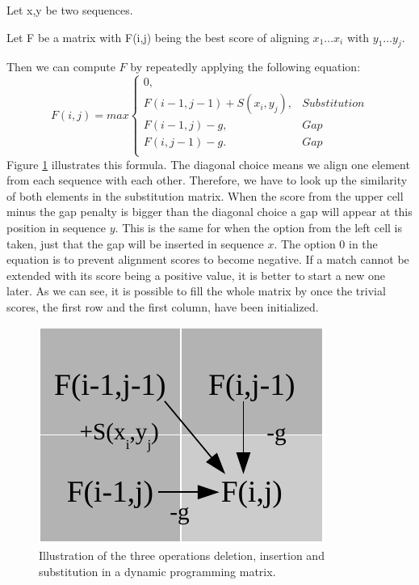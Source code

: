 \begin{definition}
	\item Let x,y be two sequences.
	\item Let F be a matrix with F(i,j) being the best score of aligning $x_1\dots x_i$ with $y_1\dots y_j$.
\end{definition}
Then we can compute $F$ by repeatedly applying the following equation:
\begin{equation}
F(i,j) = max \left\{ \begin{array}{lr}0,&\\F(i-1,j-1)+S(x_i,y_j),&Substitution\\F(i-1,j)-g,&Gap\\F(i,j-1)-g.&Gap\\\end{array} \right.
\end{equation}
Figure \ref{fig:basicalignmentoperations} illustrates this formula.
The diagonal choice means we align one element from each sequence with each other.
Therefore, we have to look up the similarity of both elements in the substitution matrix.
When the score from the upper cell minus the gap penalty is bigger than the diagonal choice a gap will appear at this position in sequence $y$.
This is the same for when the option from the left cell is taken, just that the gap will be inserted in sequence $x$.
The option 0 in the equation is to prevent alignment scores to become negative.
If a match cannot be extended with its score being a positive value, it is better to start a new one later.
As we can see, it is possible to fill the whole matrix by once the trivial scores, the first row and the first column, have been initialized.

\begin{figure}
	\centering
	\includegraphics{img/basic_cell_fill.pdf}
	\caption{Illustration of the three operations deletion, insertion and substitution in a dynamic programming matrix.}
	\label{fig:basicalignmentoperations}
\end{figure}

